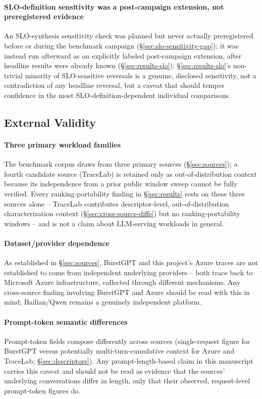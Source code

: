 \paragraph{SLO-definition sensitivity was a post-campaign extension, not
preregistered evidence} An SLO-synthesis sensitivity check was planned but
never actually preregistered before or during the benchmark campaign
(\S\ref{sec:slo-sensitivity-gap}); it was instead run afterward as an
explicitly labeled post-campaign extension, after headline results were
already known (\S\ref{sec:results-slo}). \S\ref{sec:results-slo}'s
non-trivial minority of SLO-sensitive reversals is a genuine, disclosed
sensitivity, not a contradiction of any headline reversal, but a caveat
that should temper confidence in the most SLO-definition-dependent
individual comparisons.

\subsection{External Validity}

\paragraph{Three primary workload families} The benchmark corpus draws from
three primary sources (\S\ref{sec:sources}); a fourth candidate source
(TraceLab) is retained only as out-of-distribution context because its
independence from a prior public window sweep cannot be fully verified.
Every ranking-portability finding in \S\ref{sec:results} rests on these
three sources alone -- TraceLab contributes descriptor-level,
out-of-distribution characterization context (\S\ref{sec:cross-source-diffs})
but no ranking-portability windows -- and is not a claim about LLM-serving
workloads in general.

\paragraph{Dataset/provider dependence} As established in
\S\ref{sec:sources}, BurstGPT and this project's Azure traces are not
established to come from independent underlying providers -- both trace
back to Microsoft Azure infrastructure, collected through different
mechanisms. Any cross-source finding involving BurstGPT and Azure should be
read with this in mind; Bailian/Qwen remains a genuinely independent
platform.

\paragraph{Prompt-token semantic differences} Prompt-token fields compose
differently across sources (single-request figure for BurstGPT versus
potentially multi-turn-cumulative context for Azure and TraceLab;
\S\ref{sec:descriptors}). Any prompt-length-based claim in this manuscript
carries this caveat and should not be read as evidence that the sources'
underlying conversations differ in length, only that their observed,
request-level prompt-token figures do.

